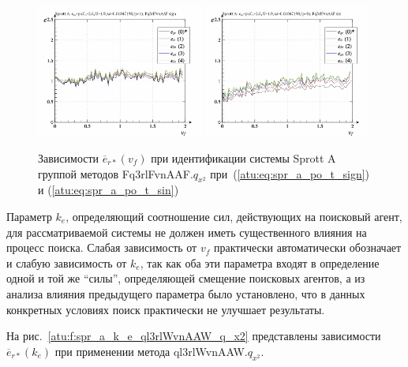 \begin{figure}[htb!]
  \centerline{
    \includegraphics[width=0.49\textwidth]{p/cha/spr_a/Fq3rlFvnAAF_x2/sprott_a_id-p_v_f_sign.png}
    \hfill
    \includegraphics[width=0.49\textwidth]{p/cha/spr_a/Fq3rlFvnAAF_x2/sprott_a_id-p_v_f_sin.png}
  }
  \caption{Зависимости $\overline{e}_{r*}(v_f)$ при идентификации системы Sprott A группой методов Fq3rlFvnAAF.$q_{x^2}$
   при~(\ref{atu:eq:spr_a_po_t_sign}) и (\ref{atu:eq:spr_a_po_t_sin})}
  \label{atu:f:spr_a_v_f_Fq3rlFvnAAF_q_x2}
\end{figure}

Параметр $k_e$, определяющий соотношение сил, действующих
на поисковый агент, для рассматриваемой системы не должен
иметь существенного влияния на процесс поиска.
Слабая зависимость от $v_f$ практически автоматически обозначает
и слабую зависимость от $k_e$, так как оба эти параметра
входят в определение одной и той же ``силы'',
определяющей смещение поисковых агентов, а из
анализа влияния предыдущего параметра было установлено,
что в данных конкретных условиях поиск практически не улучшает результаты.


На рис.~\ref{atu:f:spr_a_k_e_ql3rlWvnAAW_q_x2} представлены зависимости
$\overline{e}_{r*}(k_e)$ при применении метода ql3rlWvnAAW.$q_{x^2}$.

